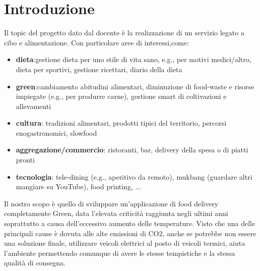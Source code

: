 \documentclass{article}
\begin{document}
\section{Introduzione}\par
Il topic del progetto dato dal docente è la realizzazione di un servizio legato a cibo e alimentazione. Con particolare aree di interessi,come: \par
\begin{itemize}
    \item \textbf{dieta}:gestione dieta per uno stile di vita sano, e.g., per motivi medici/altro, dieta per sportivi, gestione ricettari, diario della dieta \par
    \item \textbf{green}:cambiamento abitudini alimentari, diminuzione di food-waste e risorse impiegate (e.g., per produrre carne), gestione smart di coltivazioni e allevamenti \par
    \item \textbf{cultura}: tradizioni alimentari, prodotti tipici del territorio, percorsi enogastronomici, slowfood\par
    \item \textbf{aggregazione/commercio}: ristoranti, bar, delivery della spesa o di piatti pronti \par
    \item \textbf{tecnologia}: tele-dining (e.g., aperitivo da remoto), mukbang (guardare altri mangiare su YouTube), food printing, ... \par
\end{itemize}
\vspace{1cm}



     \par
    Il nostro scopo è quello di sviluppare un’applicazione di food delivery completamente Green, data l'elevata criticità raggiunta negli ultimi anni soprattutto a causa dell'eccessivo aumento delle temperature. Visto che una delle principali cause è dovuta alle alte emissioni di CO2, anche se potrebbe non essere una soluzione finale, utilizzare veicoli elettrici al posto di veicoli termici, aiuta l’ambiente permettendo comunque di avere le stesse tempistiche e la stessa qualità di consegna.
    \vspace{1cm}
    
\end{document}
